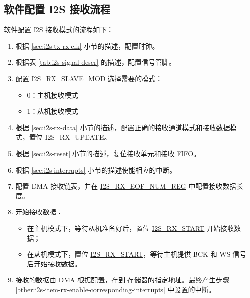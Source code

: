 \documentclass[main\_\_CN.tex]{subfiles}
\begin{document}
\subsection{软件配置 I2S 接收流程}\label{sec:i2s-configure-i2s-rx-mode}
软件配置 I2S 接收模式的流程如下：

\begin{enumerate}
    \item 根据 \ref{sec:i2s-tx-rx-clk} 小节的描述，配置时钟。

    \item 根据表 \ref{tab:i2s-signal-descr} 的描述，配置信号管脚。

    \item 配置 \hyperref[fielddesc:I2SRXSLAVEMOD]{I2S\_RX\_SLAVE\_MOD} 选择需要的模式：
    \begin{itemize}
        \item 0：主机接收模式
        \item 1：从机接收模式
    \end{itemize}
    
    \item 根据 \ref{sec:i2s-rx-data} 小节的描述，配置正确的接收通道模式和接收数据模式，置位 \hyperref[fielddesc:I2SRXUPDATE]{I2S\_RX\_UPDATE}。

    \item 根据 \ref{sec:i2s-reset} 小节的描述，复位接收单元和接收 FIFO。
    \item 根据 \ref{sec:i2s-interrupts} 小节的描述使能相应的中断。\label{other:i2s-item-rx-enable-corresponding-interrupts}
    
    \item 配置 DMA 接收链表，并在 \hyperref[regdesc:I2SRXEOFNUMREG]{I2S\_RX\_EOF\_NUM\_REG} 中配置接收数据长度。

    \item 开始接收数据：
    \begin{itemize}
        \item 在主机模式下，等待从机准备好后，置位 \hyperref[fielddesc:I2SRXSTART]{I2S\_RX\_START} 开始接收数据；
        \item 在从机模式下，置位 \hyperref[fielddesc:I2SRXSTART]{I2S\_RX\_START}，等待主机提供 BCK 和 WS 信号后开始接收数据。
    \end{itemize}
    \item 接收的数据由 DMA 根据配置，存到 \chipname{} 存储器的指定地址。最终产生步骤 \ref{other:i2s-item-rx-enable-corresponding-interrupts} 中设置的中断。
\end{enumerate}
\end{document}
